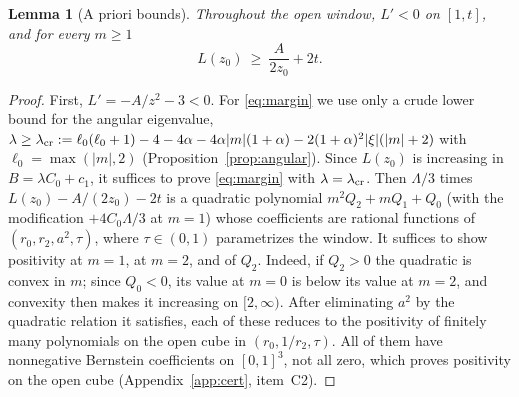 \documentclass[11pt]{amsart}
\newtheorem{lemma}[theorem]{Lemma}
\theoremstyle{definition}
\theoremstyle{remark}
\numberwithin{equation}{section}
\begin{document}
\begin{lemma}[A priori bounds]\label{lem:floor}
Throughout the open window, $L'<0$ on $[1,t]$, and for every $m\ge1$
\begin{equation}\label{eq:margin}
L(z_0)\ \ge\ \frac{A}{2z_0}+2t .
\end{equation}
\end{lemma}
\begin{proof}
First, $L'=-A/z^2-3<0$. For \eqref{eq:margin} we use only a crude lower bound for the angular eigenvalue,
$\lambda\ge\lambda_{\rm cr}:=\ell_0(\ell_0+1)-4-4\alpha-4\alpha|m|(1+\alpha)-2(1+\alpha)^2|\xi|(|m|+2)$ with
$\ell_0=\max(|m|,2)$ (Proposition~\ref{prop:angular}). Since $L(z_0)$ is increasing in $B=\lambda C_0+c_1$, it suffices to prove
\eqref{eq:margin} with $\lambda=\lambda_{\rm cr}$. Then $\Lambda/3$ times $L(z_0)-A/(2z_0)-2t$ is a quadratic polynomial
$m^2Q_2+mQ_1+Q_0$ (with the modification $+4C_0\Lambda/3$ at $m=1$) whose coefficients are rational functions of
$(r_0,r_2,a^2,\tau)$, where $\tau\in(0,1)$ parametrizes the window. It suffices to show positivity at $m=1$, at $m=2$, and of $Q_2$. Indeed, if $Q_2>0$ the
quadratic is convex in $m$; since $Q_0<0$, its value at $m=0$ is below its value at $m=2$, and convexity then makes
it increasing on $[2,\infty)$. After eliminating $a^2$ by the quadratic relation it satisfies, each of these reduces
to the positivity of finitely many polynomials on the open cube in $(r_0,1/r_2,\tau)$. All of them have nonnegative
Bernstein coefficients on $[0,1]^3$, not all zero, which proves positivity on the open cube (Appendix~\ref{app:cert},
item~C2).
\end{proof}
\end{document}

